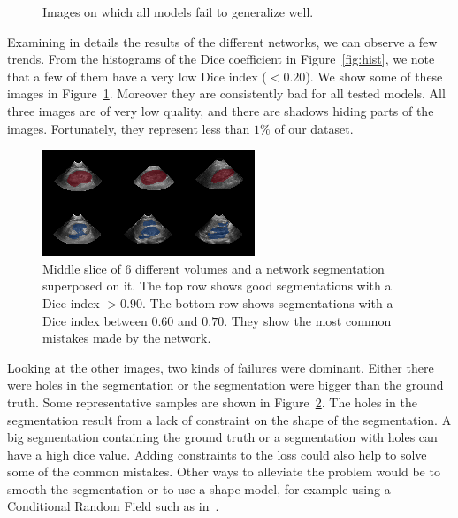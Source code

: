 \begin{figure}[htb]
\begin{subfigure}{.33\textwidth}
\end{subfigure}
\caption{Images on which all models fail to generalize well.}
\label{fig:bad_images}
\end{figure}

Examining in details the results of the different networks, we can observe a few trends. From the histograms of the Dice coefficient in Figure~\ref{fig:hist}, we note that a few of them have a very low Dice index ($< 0.20$). We show some of these images in Figure~\ref{fig:bad_images}. Moreover they are consistently bad for all tested models. All three images are of very low quality, and there are shadows hiding parts of the images. Fortunately, they represent less than $1 \%$ of our dataset.

\begin{figure}[htb]
	\includegraphics[width=\textwidth]{img_transfer/seg_good_bad}
    \caption{Middle slice of 6 different volumes and a network segmentation superposed on it. The top row shows good segmentations with a Dice index $> 0.90$. The bottom row shows segmentations with a Dice index between $0.60$ and $0.70$. They show the most common mistakes made by the network.}
    \label{fig:mseg}
\end{figure}

Looking at the other images, two kinds of failures were dominant. Either there were holes in the segmentation or the segmentation were bigger than the ground truth. Some representative samples are shown in Figure~\ref{fig:mseg}. The holes in the segmentation result from a lack of constraint on the shape of the segmentation. A big segmentation containing the ground truth or a segmentation with holes can have a high dice value. Adding constraints to the loss could also help to solve some of the common mistakes. Other ways to alleviate the problem would be to smooth the segmentation or to use a shape model, for example using a Conditional Random Field such as in~\textcite{kamnitsas2017MEDIA}.

